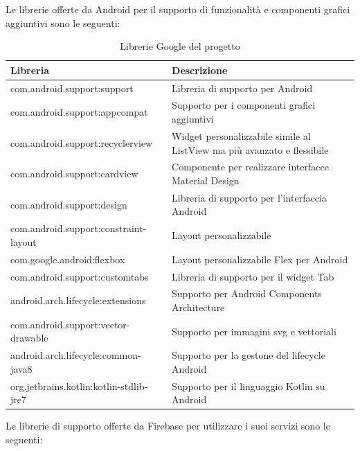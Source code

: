 \newpage
Le librerie offerte da Android per il supporto di funzionalità e componenti grafici aggiuntivi sono le seguenti:
\begin{table}[!h]
\begin{center}
\begin{tabular}{|l|p{7cm}|}
    \hline
\textbf{Libreria} & \textbf{Descrizione}\\ \hline
com.android.support:support & Libreria di supporto per Android  \\ \hline
com.android.support:appcompat & Supporto per i componenti grafici aggiuntivi \\ \hline
com.android.support:recyclerview & Widget personalizzabile simile al ListView ma più avanzato e flessibile \\ \hline
com.android.support:cardview & Componente per realizzare interfacce Material Design \\ \hline
com.android.support:design & Libreria di supporto per l'interfaccia Android  \\ \hline
com.android.support:constraint-layout & Layout personalizzabile \\ \hline
com.google.android:flexbox  & Layout personalizzabile Flex per Android  \\ \hline
com.android.support:customtabs & Libreria di supporto per il widget Tab  \\ \hline
android.arch.lifecycle:extensions & Supporto per Android Components Architecture \\ \hline
com.android.support:vector-drawable & Supporto per immagini svg e vettoriali  \\ \hline
android.arch.lifecycle:common-java8 &  Supporto per la gestone del lifecycle Android \\ \hline
org.jetbrains.kotlin:kotlin-stdlib-jre7 & Supporto per il linguaggio Kotlin su Android \\ \hline
\end{tabular}
\caption[Librerie Google del progetto]{Librerie Google del progetto}\label{tab:Librerie Google del progetto}
\end{center}
\end{table}

\newpage

Le librerie di supporto offerte da Firebase per utilizzare i suoi servizi sono le seguenti:

